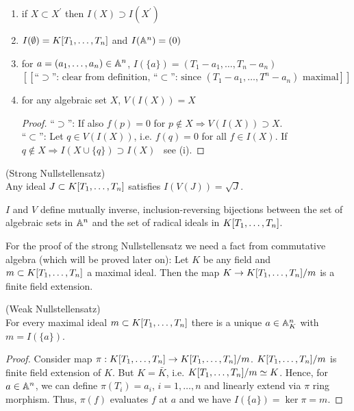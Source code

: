 \documentclass[a4paper,11pt]{article}
\begin{document}
			\begin{remark}
				\begin{enumerate}
					\item if $X\subset X^\prime$ then $I(X)\supset I(X^\prime)$
					\item $I(\emptyset)=\K$ and $I(\AA^n)=(0)$
					\item for $a=(a_1,\dots,a_n)\in\AA^n$, $I(\{a\})=(T_1-a_1,\dots,T_n-a_n)$\\$[[\text{``$\supset$'': clear from definition, ``$\subset$'': since $(T_1-a_1,\dots,T^n-a_n)$ maximal}]]$
					\item for any algebraic set $X$, $V(I(X))=X$
					\begin{proof}
						``$\supset$'': If also $f(p)=0$ for $p\notin X\Longrightarrow V(I(X))\supset X$.\\
						``$\subset$'': Let $q\in V(I(X))$, i.e. $f(q)=0$ for all $f\in I(X)$. If $q\notin X\Longrightarrow I(X\cup\{q\})\supset I(X)$ \contradiction \ see (i).	
					\end{proof}
				\end{enumerate}
			\end{remark}

			\begin{thm}\label{thm--nullstellensatz}
				(Strong Nullstellensatz)\\ Any ideal $J\subset\K$ satisfies $I(V(J))=\sqrt{J}$.
			\end{thm}

			\begin{cor}
				$I$ and $V$ define mutually inverse, inclusion-reversing bijections between the set of algebraic sets in $\AA^n$ and the set of radical ideals in $\K$.
			\end{cor}

			For the proof of the strong Nullstellensatz we need a fact from commutative algebra (which will be proved later on): Let $K$ be any field and $m\subset\K$ a maximal ideal. Then the map $K\rightarrow\K/m$ is a finite field extension.

			\begin{thm}
				(Weak Nullstellensatz)\\ For every maximal ideal $m\subset\K$ there is a unique $a\in\AA^n_K$ with $m=I(\{a\})$.
			\end{thm}
			\begin{proof}
				Consider map $\pi:\K\rightarrow \K/m$. $\K/m$ is finite field extension of $K$. But $K=\bar{K}$, i.e. $\K/m\simeq K$. Hence, for $a\in\AA^n$, we can define $\pi(T_i)=a_i$, $i=1,\dots,n$ and linearly extend via $\pi$ ring morphism. Thus, $\pi(f)$ evaluates $f$ at $a$ and we have $I(\{a\})=\ker\pi=m.$ 
			\end{proof}
\end{document}
